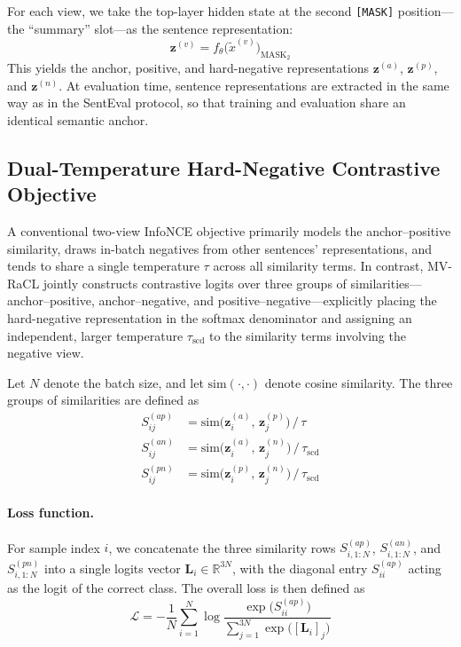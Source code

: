 \documentclass[a4paper,fleqn]{cas-dc}
\begin{document}
 For each view, we take the top-layer hidden state at the second \texttt{[MASK]} position---the ``summary'' slot---as the sentence representation:
\begin{equation}
\mathbf{z}^{(v)} = f_\theta\bigl(\tilde{x}^{(v)}\bigr)_{\text{MASK}_2}
\end{equation}
This yields the anchor, positive, and hard-negative representations $\mathbf{z}^{(a)}$, $\mathbf{z}^{(p)}$, and $\mathbf{z}^{(n)}$. At evaluation time, sentence representations are extracted in the same way as in the SentEval protocol, so that training and evaluation share an identical semantic anchor.

\subsection{Dual-Temperature Hard-Negative Contrastive Objective}
\label{subsec:dt-loss}

A conventional two-view InfoNCE objective primarily models the anchor--positive similarity, draws in-batch negatives from other sentences' representations, and tends to share a single temperature $\tau$ across all similarity terms. In contrast, MV-RaCL jointly constructs contrastive logits over three groups of similarities---anchor--positive, anchor--negative, and positive--negative---explicitly placing the hard-negative representation in the softmax denominator and assigning an independent, larger temperature $\tau_{\mathrm{scd}}$ to the similarity terms involving the negative view.

Let $N$ denote the batch size, and let $\mathrm{sim}(\cdot,\cdot)$ denote cosine similarity. The three groups of similarities are defined as
\begin{align}
S^{(ap)}_{ij} &= \mathrm{sim}\bigl(\mathbf{z}_i^{(a)},\, \mathbf{z}_j^{(p)}\bigr)\,/\,\tau \\
S^{(an)}_{ij} &= \mathrm{sim}\bigl(\mathbf{z}_i^{(a)},\, \mathbf{z}_j^{(n)}\bigr)\,/\,\tau_{\mathrm{scd}} \\
S^{(pn)}_{ij} &= \mathrm{sim}\bigl(\mathbf{z}_i^{(p)},\, \mathbf{z}_j^{(n)}\bigr)\,/\,\tau_{\mathrm{scd}}
\end{align}

\paragraph{Loss function.} For sample index $i$, we concatenate the three similarity rows $S^{(ap)}_{i,1:N}$, $S^{(an)}_{i,1:N}$, and $S^{(pn)}_{i,1:N}$ into a single logits vector $\mathbf{L}_i \in \mathbb{R}^{3N}$, with the diagonal entry $S^{(ap)}_{ii}$ acting as the logit of the correct class. The overall loss is then defined as
\begin{equation}
\mathcal{L} = -\frac{1}{N}\sum_{i=1}^{N} \log \frac{\exp\bigl(S^{(ap)}_{ii}\bigr)}{\sum_{j=1}^{3N} \exp\bigl([\mathbf{L}_i]_{j}\bigr)}
\end{equation}
\end{document}
